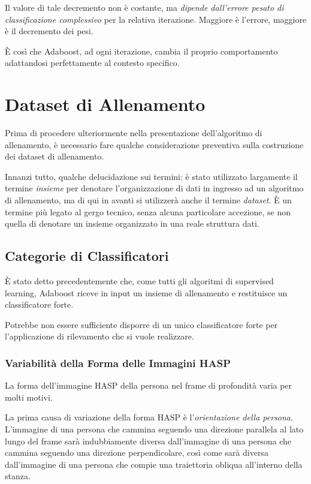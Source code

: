                 Il valore di tale decremento non è costante, ma \emph{dipende dall'errore pesato di classificazione complessivo} per la relativa iterazione. 
                Maggiore è l'errore, maggiore è il decremento dei pesi.
                
                È così che Adaboost, ad ogni iterazione, cambia il proprio comportamento adattandosi perfettamente al contesto specifico.

    \section{Dataset di Allenamento}
    \label{sec:training_dataset}
        Prima di procedere ulteriormente nella presentazione dell'algoritmo di allenamento, è necessario fare qualche considerazione preventiva sulla costruzione dei dataset di allenamento.

        Innanzi tutto, qualche delucidazione sui termini: è stato utilizzato largamente il termine \emph{insieme} per denotare l'organizzazione di dati in ingresso ad un algoritmo di allenamento, ma di qui in avanti si utilizzerà anche il termine \emph{dataset}.
        È un termine più legato al gergo tecnico, senza alcuna particolare accezione, se non quella di denotare un insieme organizzato in una reale struttura dati.

        \subsection{Categorie di Classificatori}
        \label{sub:classifiers_categories}
            È stato detto precedentemente che, come tutti gli algoritmi di supervised learning, Adaboost riceve in input un insieme di allenamento e restituisce un classificatore forte.

            Potrebbe non essere sufficiente disporre di un unico classificatore forte per l'applicazione di rilevamento che si vuole realizzare.

            \subsubsection{Variabilità della Forma delle Immagini HASP}
                La forma dell'immagine HASP della persona nel frame di profondità varia per molti motivi.

                La prima causa di variazione della forma HASP è l'\emph{orientazione della persona}.
                L'immagine di una persona che cammina seguendo una direzione parallela al lato lungo del frame sarà indubbiamente diversa dall'immagine di una persona che cammina seguendo una direzione perpendicolare, così come sarà diversa dall'immagine di una persona che compie una traiettoria obliqua all'interno della stanza.

